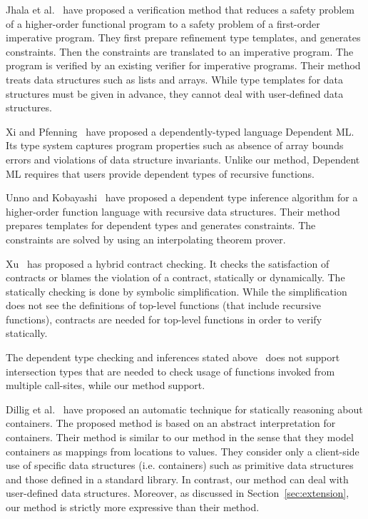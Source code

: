Jhala et al.~\cite{Jhala2011} have proposed a verification method that
reduces a safety problem of a higher-order functional program to a safety
problem of a first-order imperative program.
They first prepare refinement type templates, and generates constraints.
Then the constraints are translated to an imperative program.
The program is verified by an existing verifier for imperative programs.
Their method treats data structures such as lists and arrays.
While type templates for data structures must be given in advance,
they cannot deal with user-defined data structures.

Xi and Pfenning~\cite{Xi1999} have proposed a dependently-typed language
Dependent ML.  Its type system captures program properties such as
absence of array bounds errors and violations of data structure
invariants.  Unlike our method, Dependent ML requires that users provide
dependent types of recursive functions.

Unno and Kobayashi~\cite{Unno2009} have proposed a dependent type
inference algorithm for a higher-order function language with recursive
data structures.  Their method prepares templates for dependent types
and generates constraints.  The constraints are solved by using an
interpolating theorem prover.

Xu~\cite{Xu2012} has proposed a hybrid contract checking.  It checks the
satisfaction of contracts or blames the violation of a contract,
statically or dynamically.  The statically checking is done by symbolic
simplification.  While the simplification does not see the definitions
of top-level functions (that include recursive functions), contracts are
needed for top-level functions in order to verify statically.

The dependent type checking and inferences stated
above~\cite{Unno2010,Rondon2008,Kawaguchi2009,Unno2009} does not support
intersection types that are needed to check usage of
functions invoked from multiple call-sites, while our method support.

Dillig et al.~\cite{Dillig2011} have proposed an automatic technique for
statically reasoning about containers.  The proposed method is based on
an abstract interpretation for containers.  Their method is similar to
our method in the sense that they model containers as mappings from
locations to values.  They consider only a client-side use of specific
data structures (i.e. containers) such as primitive data structures and
those defined in a standard library.  In contrast, our method can deal
with user-defined data structures.  Moreover, as discussed in
Section~\ref{sec:extension}, our method is strictly more expressive than
their method.

